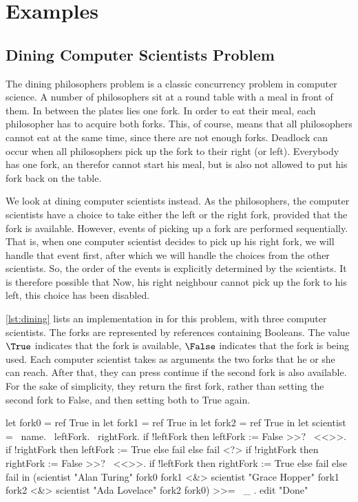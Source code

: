 
\section{Examples}
\label{sec:examples}

\subsection{Dining Computer Scientists Problem}

The dining philosophers problem is a classic concurrency problem in computer science.
A number of philosophers sit at a round table with a meal in front of them.
In between the plates lies one fork.
In order to eat their meal, each philosopher has to acquire both forks.
This, of course, means that all philosophers cannot eat at the same time, since there are not enough forks.
Deadlock can occur when all philosophers pick up the fork to their right (or left).
Everybody has one fork, an therefor cannot start his meal, but is also not allowed to put his fork back on the table.

We look at dining computer scientists instead.
As the philosophers, the computer scientists have a choice to take either the left or the right fork, provided that the fork is available.
However, events of picking up a fork are performed sequentially.
That is, when one computer scientist decides to pick up his right fork,
we will handle that event first,
after which we will handle the choices from the other scientists.
So, the order of the events is explicitly determined by the scientists.
It is therefore possible that Now, his right neighbour cannot pick up the fork to his left,
this choice has been disabled.

\cref{lst:dining} lists an implementation in \TOPHAT for this problem, with three computer scientists.
The forks are represented by references containing Booleans.
The value $\True$ indicates that the fork is available,
$\False$ indicates that the fork is being used.
Each computer scientist takes as arguments the two forks that he or she can reach.
After that, they can press continue if the second fork is also available.
For the sake of simplicity, they return the first fork, rather than setting the second fork to False, and then setting both to True again.

\begin{TASK}[
    float=ht,
    numbers=right,
    caption={Dining computer scientists problem with three computer scientists.},
    label=lst:dining]
  let fork0 = ref True in
  let fork1 = ref True in
  let fork2 = ref True in
  let scientist = \ name. \ leftFork. \ rightFork.
    if !leftFork
      then leftFork := False >>? \ <<>>.
        if !rightFork then leftFork := True else fail
      else fail
    <?>
    if !rightFork
      then rightFork := False >>? \ <<>>.
        if !leftFork then rightFork := True else fail
       else fail in
  (scientist "Alan Turing" fork0 fork1 <&>
  scientist "Grace Hopper" fork1 fork2 <&>
  scientist "Ada Lovelace" fork2 fork0) >>= \ _ .
    edit "Done"
\end{TASK}


